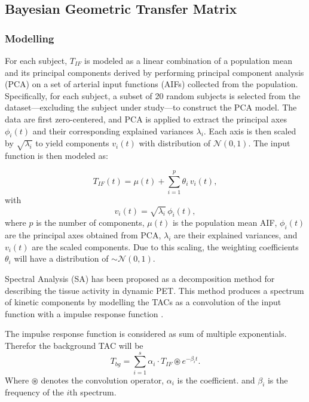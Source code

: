 \subsection{Bayesian Geometric Transfer Matrix}
\subsubsection{Modelling}
For each subject, $T_{IF}$ is modeled as a linear combination of a population mean and its principal components derived by performing principal component analysis (PCA) on a set of arterial input functions (AIFs) collected from the population.
Specifically, for each subject, a subset of 20 random subjects is selected from the dataset—excluding the subject under study—to construct the PCA model.
The data are first zero-centered, and PCA is applied to extract the principal axes \(\phi_i(t)\) and their corresponding explained variances \(\lambda_i\).
Each axis is then scaled by \(\sqrt{\lambda_i}\) to yield components \(v_i(t)\) with distribution of \(\mathcal{N}(0,1)\). The input function is then modeled as:

\begin{equation}
	T_{IF}(t) = \mu(t) + \sum_{i=1}^p \theta_i\,v_i(t),
\end{equation}
with
\[
	v_i(t) = \sqrt{\lambda_i}\,\phi_i(t),
\]
where $p$ is the number of components, \(\mu(t)\) is the population mean AIF, \(\phi_i(t)\) are the principal axes obtained from PCA, \(\lambda_i\) are their explained variances, and \(v_i(t)\) are the scaled components. Due to this scaling, the weighting coefficients \(\theta_i\) will have a distribution of \(\sim \mathcal{N}(0,1)\).

Spectral Analysis (SA) has been proposed as a decomposition method for describing the tissue activity in dynamic PET.
This method produces a spectrum of kinetic components by modelling the TACs as a convolution of the input function with a impulse response function \cite{TODO}.

The impulse response function is considered as sum of multiple exponentials. Therefor the background TAC will be
\[
	T_{bg} = \sum_{i=1}^s \alpha_{i} \cdot T_{IF} \circledast e^{-\beta_{i} t}.
\]
Where $\circledast$ denotes the convolution operator, \(\alpha_i\) is the coefficient. and \(\beta_i\) is the frequency of the \(i\)th spectrum.


